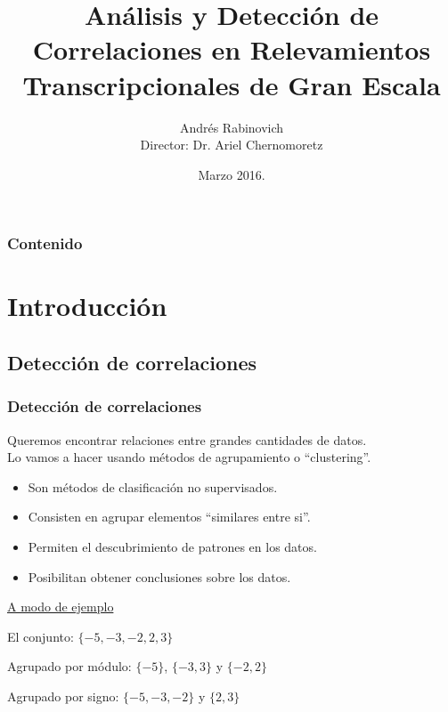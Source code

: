 \documentclass[serif,9pt, t]{beamer}
\newif\ifplacelogo %
\begin{document}
\title[Análisis y Detección de Correlaciones en Relevamien\ldots ]{Análisis y Detección de Correlaciones en Relevamientos Transcripcionales de Gran Escala}  
\author[Andrés Rabinovich]{Andrés Rabinovich\\{\small Director: Dr. Ariel Chernomoretz}}

\date{Marzo 2016.}


\begin{frame}
\titlepage
\end{frame}

\placelogofalse

\begin{frame}\frametitle{Contenido}
\tableofcontents
\end{frame} 

\section{Introducción} 

\subsection{Detección de correlaciones}
\begin{frame}\frametitle{Detección de correlaciones} 
\large
Queremos encontrar relaciones entre grandes cantidades de datos.\\\bigskip
Lo vamos a hacer usando métodos de agrupamiento o ``clustering''.\medskip
\normalsize
\begin{itemize}
\item Son métodos de clasificación no supervisados.
\item Consisten en agrupar elementos ``similares entre si''.
\item Permiten el descubrimiento de patrones en los datos.
\item Posibilitan obtener conclusiones sobre los datos.
\end{itemize}
\bigskip
\underline{A modo de ejemplo}\medskip

El conjunto: $\{-5, -3, -2, 2, 3\}$\medskip

Agrupado por módulo: $\{-5\}$, $\{-3, 3\}$ y $\{-2, 2\}$\medskip

Agrupado por signo: $\{-5, -3, -2\}$ y $\{2, 3\}$
\end{frame}
\end{document}
